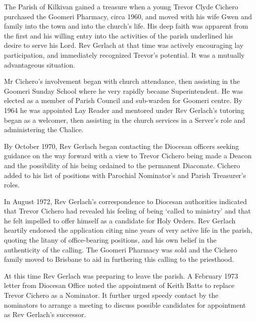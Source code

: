 The Parish of Kilkivan gained a treasure when a young Trevor Clyde Cichero purchased the Goomeri Pharmacy, circa 1960, and moved with his wife Gwen and family into the town and into the church's life. His deep faith was apparent from the first and his willing entry into the activities of the parish underlined his desire to serve his Lord. Rev Gerlach at that time was actively encouraging lay participation, and immediately recognized Trevor's potential. It was a mutually advantageous situation.



Mr Cichero's involvement began with church attendance, then assisting in the Goomeri Sunday School where he very rapidly became Superintendent. He was elected as a member of Parish Council and sub-warden for Goomeri centre. By 1964 he was appointed Lay Reader and mentored under Rev Gerlach's tutoring began as a welcomer, then assisting in the church services in a Server's role and administering the Chalice.



By October 1970, Rev Gerlach began contacting the Diocesan officers seeking guidance on the way forward with a view to Trevor Cichero being made a Deacon and the possibility of his being ordained to the permanent Diaconate. Cichero added to his list of positions with Parochial Nominator's and Parish Treasurer's roles.



In August 1972, Rev Gerlach's correspondence to Diocesan authorities indicated that Trevor Cichero had revealed his feeling of being `called to ministry' and that he felt impelled to offer himself as a candidate for Holy Orders. Rev Gerlach heartily endorsed the application citing nine years of very active life in the parish, quoting the litany of office-bearing positions, and his own belief in the authenticity of the calling. The Goomeri Pharmacy was sold and the Cichero family moved to Brisbane to aid in furthering this calling to the priesthood.



At this time Rev Gerlach was preparing to leave the parish. A February 1973 letter from Diocesan Office noted the appointment of Keith Batts to replace Trevor Cichero as a Nominator. It further urged speedy contact by the nominators to arrange a meeting to discuss possible candidates for appointment as Rev Gerlach's successor.



